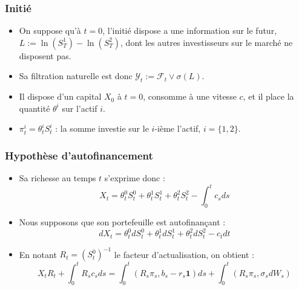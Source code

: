 \documentclass{beamer}
\begin{document}
\begin{frame}
\frametitle{Initié}
\begin{itemize}
\item On suppose qu'à $t= 0$, l'initié dispose a une information sur le futur, $L := \ln(S^1_T) - \ln(S^2_T)$, dont les autres investisseurs sur le marché ne disposent pas.  \\
\item Sa filtration naturelle est donc $\mathcal{Y}_t := \mathcal{F}_t \vee \sigma(L)$.\\
\item Il dispose d'un capital $X_0$ à $t=0$, consomme à une vitesse $c$, et il place la quantité $\theta^i$ sur l'actif $i$.\\
\item $\pi_t^i = \theta^i_t S^i_t$ : la somme investie sur le $i$-ième l'actif, $i= \{1, 2\}$.
\end{itemize}
\end{frame}

\begin{frame}
\frametitle{Hypothèse d'autofinancement}
\begin{itemize}

\item Sa richesse au temps $t$ s'exprime donc : 
\begin{equation*}
X_t = \displaystyle \theta^0_t S^0_t  + \theta^1_t S^1_t  + \theta^2_t S^2_t - \int_{0}^{t} c_s ds
\end{equation*}

\item Nous supposons que son portefeuille est autofinançant : 
\begin{equation*}
dX_t = \displaystyle  \theta^0_t dS^0_t + \theta^1_t dS^1_t + \theta^2_t dS^2_t - c_t dt
\end{equation*}

\item En notant $R_t = (S^0_t)^{-1}$ le facteur d'actualisation, on obtient : 
\begin{equation*}
X_t R_t + \int_{0}^{t} R_s c_s ds = \int_{0}^{t} (R_s \pi_s, b_s - r_s \textbf{1})ds + \int_{0}^{t} (R_s \pi_s, \sigma_s dW_s)
\end{equation*}
\end{itemize}
\end{frame}
\end{document}
